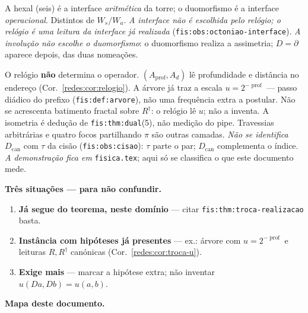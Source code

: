 \documentclass[11pt,a4paper]{article}
\newcommand{\code}[1]{\texttt{\small #1}}
\begin{document}
A hexal (seis) é a interface \emph{aritmética} da torre; o duomorfismo é a
interface \emph{operacional}. Distintos de $W_s/W_a$.
\emph{A interface não é escolhida pelo relógio; o relógio é uma leitura da
interface já realizada} (\code{fis:obs:octoniao-interface}).
\emph{A involução não escolhe o duomorfismo}: o duomorfismo realiza a assimetria;
$D=\partial$ aparece depois, das duas nomeações.

O relógio \textbf{não} determina o operador.
$(A_{\mathrm{prof}},A_d)$ lê profundidade e distância no endereço
(Cor.~\ref{redes:cor:relogio}). A árvore já traz a escala
$u=2^{-\operatorname{prof}}$ --- passo diádico do prefixo
(\code{fis:def:arvore}), não uma frequência extra a postular. Não se
acrescenta batimento fractal sobre $R^{\dagger}$: o relógio lê $u$; não a
inventa.
A isometria é dedução de \code{fis:thm:dual}(5), não medição do pipe.
Travessias arbitrárias e quatro focos partilhando $\pi$ são outras camadas.
\emph{Não se identifica} $D_{\mathrm{can}}$ com $\tau$ da cisão
(\code{fis:obs:cisao}): $\tau$ parte o par; $D_{\mathrm{can}}$ complementa o índice.
\emph{A demonstração fica em} \code{fisica.tex}; aqui só se classifica o que
este documento mede.

\medskip\noindent\textbf{Três situações --- para não confundir.}
\begin{enumerate}\itemsep3pt
\item[\textbf{(I)}] \textbf{Já segue do teorema, neste domínio} --- citar
\code{fis:thm:troca-realizacao} basta.
\item[\textbf{(II)}] \textbf{Instância com hipóteses já presentes} --- ex.: árvore
com $u=2^{-\operatorname{prof}}$ e leituras $R,R^{\dagger}$ canónicas
(Cor.~\ref{redes:cor:troca-u}).
\item[\textbf{(III)}] \textbf{Exige mais} --- marcar a hipótese extra; não
inventar $u(Da,Db)=u(a,b)$.
\end{enumerate}

\medskip\noindent\textbf{Mapa deste documento.}
\end{document}

